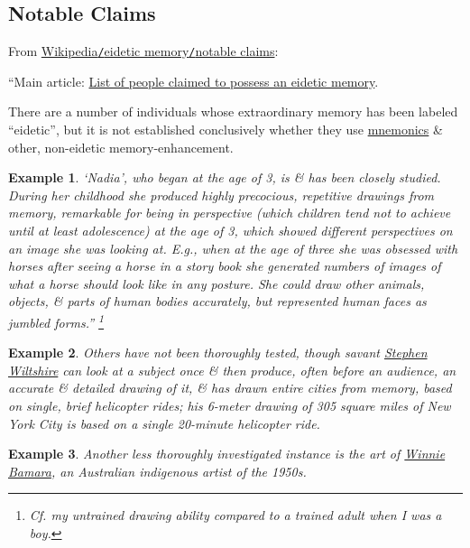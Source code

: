 \documentclass[oneside]{book}
\numberwithin{equation}{section}
\newtheorem{example}{Example}[chapter]
\begin{document}
\subsection{Notable Claims}
From \href{https://en.wikipedia.org/wiki/Eidetic_memory#Notable_claims}{Wikipedia\texttt{/}eidetic memory\texttt{/}notable claims}:

``Main article: \href{https://en.wikipedia.org/wiki/List_of_people_claimed_to_possess_an_eidetic_memory}{List of people claimed to possess an eidetic memory}.

There are a number of individuals whose extraordinary memory has been labeled ``eidetic'', but it is not established conclusively whether they use \href{https://en.wikipedia.org/wiki/Mnemonic}{mnemonics} \& other, non-eidetic memory-enhancement.

\begin{example}
	`Nadia', who began  at the age of 3, is  \& has been closely studied. During her childhood she produced highly precocious, repetitive drawings from memory, remarkable for being in perspective (which children tend not to achieve until at least adolescence) at the age of 3, which showed different perspectives on an image she was looking at. E.g., when at the age of three she was obsessed with horses after seeing a horse in a story book she generated numbers of images of what a horse should look like in any posture. She could draw other animals, objects, \& parts of human bodies accurately, but represented human faces as jumbled forms.'' \footnote{Cf. my untrained drawing ability compared to a trained adult when I was a boy.}
\end{example}

\begin{example}
	Others have not been thoroughly tested, though savant \href{https://en.wikipedia.org/wiki/Stephen_Wiltshire}{Stephen Wiltshire} can look at a subject once \& then produce, often before an audience, an accurate \& detailed drawing of it, \& has drawn entire cities from memory, based on single, brief helicopter rides; his 6-meter drawing of 305 square miles of New York City is based on a single 20-minute helicopter ride.
\end{example}

\begin{example}
	Another less thoroughly investigated instance is the art of \href{https://en.wikipedia.org/wiki/Winnie_Bamara}{Winnie Bamara}, an Australian indigenous artist of the 1950s.
\end{example}
\end{document}
